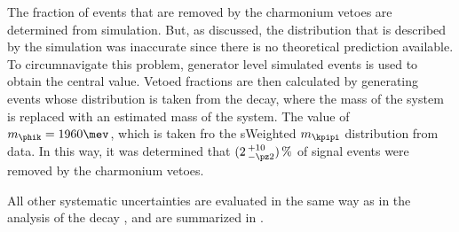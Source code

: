 The fraction of events that are removed by the charmonium vetoes are determined from simulation.
But, as discussed, the \qsq distribution that is described by the \btophikmumu simulation was
inaccurate since there is no theoretical prediction available.
To circumnavigate this problem, generator level simulated events is used to obtain the central
value.
Vetoed fractions are then calculated by generating events whose \qsq distribution is taken from the
 decay, where the mass of the  system is replaced with an
estimated mass of the \phik system.
The value of $m_{\phik}=1960\mev$, which is taken fro the sWeighted $m_{\kpipi}$ distribution from
data.
In this way, it was determined that $(2\,^{+10}_{-\pz2})\,\%$ of signal events were removed by the
charmonium vetoes.

All other systematic uncertainties are evaluated in the same way as in the analysis of the decay
\btokpipimumu, and are summarized in .


